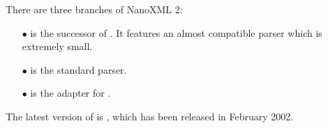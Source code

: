 There are three branches of NanoXML 2:
\begin{itemize}
  \item[$\bullet$]
     is the successor of .
    It features an almost compatible parser which is extremely small.
  \item[$\bullet$]
     is the standard parser.
  \item[$\bullet$]
     is the  adapter for .
\end{itemize}

The latest version of  is , which has been
released in February 2002.
